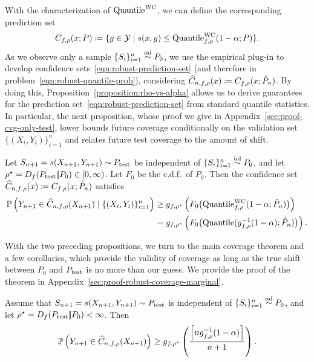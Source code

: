 With the characterization of $\textup{Quantile}^{\textup{WC}}$, we can define
the corresponding prediction set
\begin{align}
  \label{eqn:robust-prediction-set}
  C_{f,\rho}(x; P)
  \coloneqq \{ y \in \mathcal{Y} \mid s(x,y) \le \textup{Quantile}^{\textup{WC}}_{f,\rho}(1-\alpha; P)
  \}.
\end{align}
As we observe only a sample $\{S_i\}_{i=1}^n \stackrel{\rm iid}{\sim} P_0$, we
use the empirical plug-in to develop confidence
sets~\eqref{eqn:robust-prediction-set} (and therefore in
problem~\eqref{eqn:robust-quantile-prob}), considering
$\widehat{C}_{n,f,\rho}(x) \coloneqq C_{f,\rho}(x; \hat{P}_n)$.  By doing this,
Proposition~\ref{proposition:rho-vs-alpha} allows us to derive guarantees
for the prediction set~\eqref{eqn:robust-prediction-set} from standard
quantile statistics.  In particular, the next proposition, whose proof we
give in Appendix~\ref{sec:proof-cvg-only-test}, lower bounds future coverage
conditionally on the validation set $\{(X_i,Y_i)\}_{i=1}^n$ and relates
future test coverage to the amount of shift.
\begin{proposition}
  \label{proposition:cvg-only-test}
  Let $S_{n+1} = s(X_{n+1}, Y_{n+1}) \sim P_{\textup{test}}$ be
  independent of $\{S_i\}_{i=1}^n \stackrel{\rm iid}{\sim} P_0$, and let $\rho^\star =
  D_{f}({P_{\textup{test}}} |\!| {P_0}) \in \left[{0},{\infty}\right)$.  Let $F_0$ be
  the c.d.f.\ of $P_0$.  Then the confidence set $\widehat{C}_{n,f,
    \rho}(x) \coloneqq C_{f,\rho}(x; \hat{P}_n)$ satisfies
  \begin{align*}
    \mathbb{P} \left( Y_{n+1} \in \widehat{C}_{n,f, \rho}(X_{n+1}) \mid
    \{(X_i,Y_i)\}_{i=1}^n \right)
    & \geq
    g_{f,\rho^\star} \left( F_0 \big( \textup{Quantile}^{\textup{WC}}_{f,\rho}(1-\alpha; \hat P_n) \big) \right) \\
    & =  g_{f,\rho^\star} \left( F_0 \big( \textup{Quantile} ( g_{f,\rho}^{-1}(1-\alpha); \hat P_n ) \big) \right).
  \end{align*}
\end{proposition}

With the two preceding propositions, we turn to the main coverage
theorem and a few corollaries, which provide the
validity of coverage as long as the true shift between $P_0$ and
$P_{\textup{test}}$ is no more than our guess.
We provide the proof of the theorem in
Appendix~\ref{sec:proof-robust-coverage-marginal}.
\begin{theorem}
  \label{theorem:robust-coverage-marginal}
  Assume that $S_{n+1} = s(X_{n+1}, Y_{n+1}) \sim P_{\textup{test}}$ is
  independent of $\{S_i\}_{i=1}^n \stackrel{\rm iid}{\sim} P_0$, and let $\rho^\star
  = D_{f}({P_{\textup{test}}} |\!| {P_0}) < \infty$.
  Then
  \begin{equation*}
    \mathbb{P}\left(Y_{n + 1} \in \widehat{C}_{n,f,\rho}(X_{n+1})\right)
    \ge g_{f,\rho^\star}\left(\frac{\left\lceil{n g_{f,\rho}^{-1}(1 - \alpha)}\right\rceil}{n+1}
    \right).
  \end{equation*}
\end{theorem}

